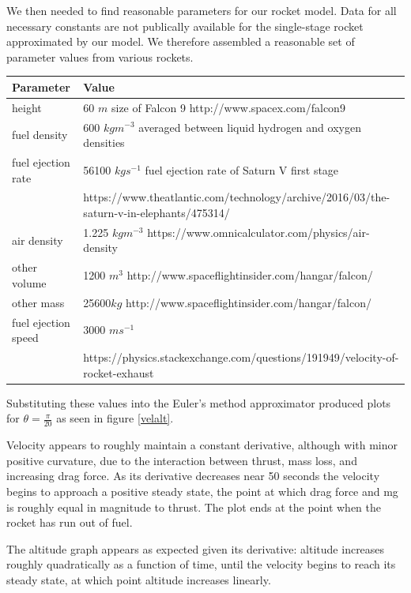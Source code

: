 \documentclass[]{article}
\begin{document}
We then needed to find reasonable parameters for our rocket model. Data for all necessary constants are not publically available for the single-stage rocket approximated by our model. We therefore assembled a reasonable set of parameter values from various rockets. 

\begin{center}
	\begin{tabular} {l l} 
		Parameter & Value \\
		\hline
		height & 60 $m$ size of Falcon 9 http://www.spacex.com/falcon9\\
		fuel density & 600 $kgm^{-3}$ averaged between liquid hydrogen and oxygen densities\\
		fuel ejection rate & 56100 $kg s^{-1}$ fuel ejection rate of Saturn V first stage \\ & \small https://www.theatlantic.com/technology/archive/2016/03/the-saturn-v-in-elephants/475314/ \normalsize\\
		air density & 1.225 $kg m^{-3}$ https://www.omnicalculator.com/physics/air-density\\
		other volume & 1200 $m^3$ http://www.spaceflightinsider.com/hangar/falcon/\\
		other mass  & 25600$kg$  http://www.spaceflightinsider.com/hangar/falcon/ \\
		fuel ejection speed & 3000 $ms^{-1}$ \\ &https://physics.stackexchange.com/questions/191949/velocity-of-rocket-exhaust
	\end{tabular}
\end{center}
	
Substituting these values into the Euler's method approximator produced plots for $\theta = \frac{\pi}{20}$ as seen in figure \ref{velalt}.

Velocity appears to roughly maintain a constant derivative, although with minor positive curvature, due to the interaction between thrust, mass loss, and increasing drag force. As its derivative decreases near 50 seconds the velocity begins to approach a positive steady state, the point at which drag force and mg is roughly equal in magnitude to thrust. The plot ends at the point when the rocket has run out of fuel.

The altitude graph appears as expected given its derivative: altitude increases roughly quadratically as a function of time, until the velocity begins to reach its steady state, at which point altitude increases linearly.
\end{document}
